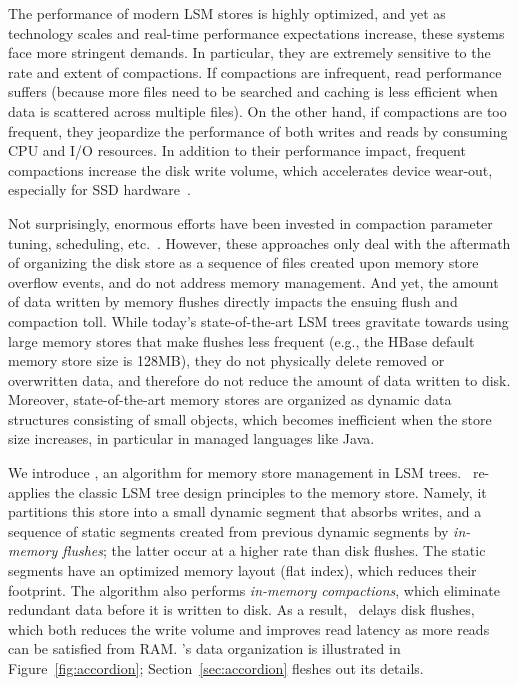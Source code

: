The performance of modern LSM stores is highly optimized, and yet as technology scales and real-time 
performance expectations increase, these systems face more stringent  demands. In particular, 
they are extremely sensitive to the rate and extent of compactions. If compactions are infrequent, read performance
suffers (because more files need to be searched and caching is less efficient when  data is scattered across multiple files). On the other hand, if 
compactions are too frequent, they jeopardize the performance of both writes and reads by consuming CPU and I/O resources. 
In addition to their performance impact, frequent compactions increase the disk write volume, which  
accelerates device wear-out, especially for SSD hardware~\cite{Hu:2009}. 

Not surprisingly, enormous efforts have been invested in compaction parameter tuning, scheduling, etc.~\cite{hbasetuning,
universalcompaction,scylladbcompaction,Sears:2012}. However, these approaches only deal with the aftermath
of organizing the disk store as a sequence of files created upon memory store overflow events, and do not 
address memory management. And yet, the amount of data written by memory flushes  
directly impacts the ensuing flush and compaction toll. 
While today's state-of-the-art LSM trees gravitate towards using large memory 
stores that make flushes less frequent (e.g., the HBase default memory store size is 128MB), 
they do not physically delete removed or overwritten data,
and therefore do not reduce the amount of data written to disk.
Moreover, state-of-the-art memory stores are organized as dynamic data structures consisting of small objects,
which becomes inefficient when the store size increases, in particular in managed languages like Java. 

We introduce \sys, an algorithm for memory store management in LSM trees. 
\sys\ re-applies the classic LSM tree design principles to the memory store. Namely, it partitions this store
 into a small dynamic segment that absorbs writes, and a sequence of static segments created 
 from previous dynamic segments by \emph{in-memory flushes}; the latter occur at a higher rate
 than disk flushes.  The static segments have an optimized memory
 layout (flat index), which reduces their footprint. The algorithm also 
 performs \emph{in-memory compactions}, which eliminate redundant %
 data before it is written to disk. As a result, \sys\ delays disk flushes, which both reduces 
 the write volume and improves read latency as more reads can be satisfied from RAM.
  \sys's data organization is illustrated in Figure~\ref{fig:accordion};
 Section~\ref{sec:accordion} fleshes out its details. 

